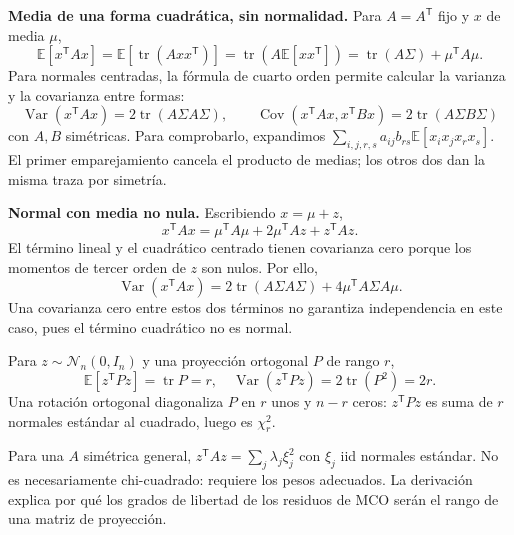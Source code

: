 \documentclass[11pt,a4paper]{article}
\newcommand{\E}{\mathbb E}
\newcommand{\T}{^{\mathsf T}}
\DeclareMathOperator{\Var}{Var}
\DeclareMathOperator{\Cov}{Cov}
\DeclareMathOperator{\tr}{tr}
\newcommand{\Normal}{\mathcal N}
\theoremstyle{definition}\newtheorem{definicion}[teorema]{Definición}
\begin{document}
\textbf{Media de una forma cuadrática, sin normalidad.}
Para $A=A\T$ fijo y $x$ de media $\mu$,
\[
\E[x\T Ax]=\E[\tr(Axx\T)]
=\tr(A\E[xx\T])
=\boxed{\tr(A\Sigma)+\mu\T A\mu}.
\]
Para normales centradas, la fórmula de cuarto orden permite calcular
la varianza y la covarianza entre formas:
\[
\boxed{\Var(x\T Ax)=2\tr(A\Sigma A\Sigma)},\qquad
\boxed{\Cov(x\T Ax,x\T Bx)=2\tr(A\Sigma B\Sigma)}
\]
con $A,B$ simétricas.
Para comprobarlo, expandimos
$\sum_{i,j,r,s}a_{ij}b_{rs}\E[x_ix_jx_rx_s]$.
El primer emparejamiento cancela el producto de medias;
los otros dos dan la misma traza por simetría.

\textbf{Normal con media no nula.} Escribiendo $x=\mu+z$,
\[
x\T Ax=\mu\T A\mu+2\mu\T Az+z\T Az.
\]
El término lineal y el cuadrático centrado tienen covarianza cero porque
los momentos de tercer orden de $z$ son nulos. Por ello,
\[
\Var(x\T Ax)=2\tr(A\Sigma A\Sigma)+4\mu\T A\Sigma A\mu.
\]
Una covarianza cero entre estos dos términos no garantiza independencia
en este caso, pues el término cuadrático no es normal.

\begin{ejemplo}
Para $z\sim\Normal_n(0,I_n)$ y una proyección ortogonal $P$ de rango $r$,
\[
\E[z\T Pz]=\tr P=r,\quad
\Var(z\T Pz)=2\tr(P^2)=2r.
\]
Una rotación ortogonal diagonaliza $P$ en $r$ unos y $n-r$ ceros:
$z\T Pz$ es suma de $r$ normales estándar al cuadrado, luego es
$\chi^2_r$.
\end{ejemplo}
Para una $A$ simétrica general,
$z\T Az=\sum_j\lambda_j\xi_j^2$ con $\xi_j$ iid normales estándar.
No es necesariamente chi-cuadrado: requiere los pesos adecuados.
La derivación explica por qué los grados de libertad de los residuos
de MCO serán el rango de una matriz de proyección.
\end{document}

